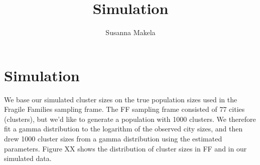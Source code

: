 \documentclass[10pt,a4paper]{article}
\author{Susanna Makela}
\title{Simulation}
\begin{document}
\maketitle

\section*{Simulation}
We base our simulated cluster sizes on the true population sizes used in the Fragile Families sampling frame. The FF sampling frame consisted of 77 cities (clusters), but we'd like to generate a population with 1000 clusters. We therefore fit a gamma distribution to the logarithm of the observed city sizes, and then drew 1000 cluster sizes from a gamma distribution using the estimated parameters. Figure XX shows the distribution of cluster sizes in FF and in our simulated data.
\end{document}
